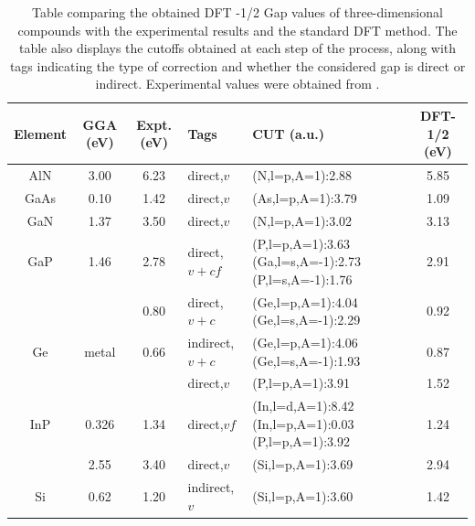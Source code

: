 \begin{table}[h]
    \small
    \setlength{\tabcolsep}{5pt} %
    \renewcommand{\arraystretch}{1.2} %
    \centering
    \caption{Table comparing the obtained DFT -1/2 Gap values of three-dimensional compounds with the experimental results and the standard DFT method. The table also displays the cutoffs obtained at each step of the process, along with tags indicating the type of correction and whether the considered gap is direct or indirect. Experimental values were obtained from \cite{Matusalem_2020}.}
    \label{tab:3d_compounds_results}
    \begin{tabular}{c c c l p{3.5cm} c}
        \hline
        \hline
        \textbf{Element} & \textbf{GGA (eV)} & \textbf{Expt. (eV)} & \textbf{Tags} & \textbf{CUT (a.u.)} & \textbf{DFT-1/2 (eV)} \\
        \hline
        AlN  & 3.00 & 6.23 &direct,$v$  & (N,l=p,A=1):2.88 & 5.85 \\
        
        GaAs & 0.10 & 1.42 & direct,$v$ & (As,l=p,A=1):3.79 & 1.09  \\
        
        
        GaN & 1.37 & 3.50 & direct,$v$  & (N,l=p,A=1):3.02 & 3.13 \\
    
        
        GaP & 1.46 & 2.78 & direct,$v+cf$  & (P,l=p,A=1):3.63 (Ga,l=s,A=-1):2.73 (P,l=s,A=-1):1.76 & 2.91 \\
    
        & & 0.80 & direct,$v+c$ & (Ge,l=p,A=1):4.04 (Ge,l=s,A=-1):2.29 & 0.92 \\
        \multirow{-2}{*}{Ge}& \multirow{-2}{*}{metal} & 0.66 &indirect,$v+c$ & (Ge,l=p,A=1):4.06 (Ge,l=s,A=-1):1.93 & 0.87 \\

    
        & & &direct,$v$  & (P,l=p,A=1):3.91  & 1.52 \\
        \multirow{-2}{*}{InP} & \multirow{-2}{*}{0.326} & \multirow{-2}{*}{1.34} & direct,$vf$  & (In,l=d,A=1):8.42 (In,l=p,A=1):0.03  (P,l=p,A=1):3.92 & 1.24 \\
        
        & 2.55 & 3.40 & direct,$v$ & (Si,l=p,A=1):3.69 & 2.94\\
        \multirow{-2}{*}{Si}& 0.62 & 1.20 & indirect,$v$ & (Si,l=p,A=1):3.60  & 1.42 \\
        \hline
        \hline
    \end{tabular}
    
\end{table}

